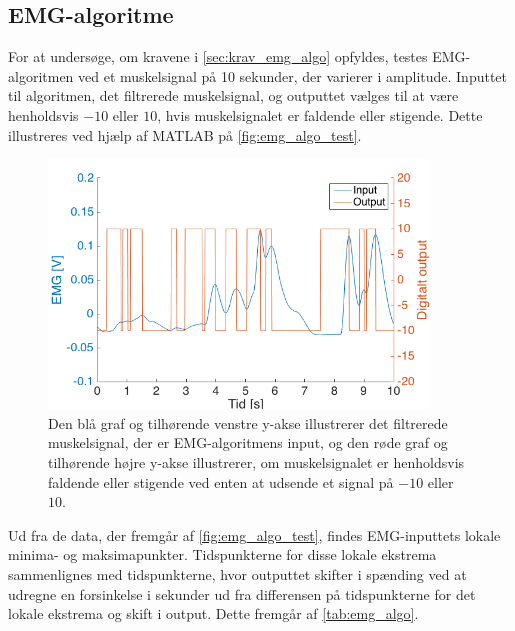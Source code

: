 \subsection{EMG-algoritme}
For at undersøge, om kravene i \autoref{sec:krav_emg_algo} opfyldes, testes EMG-algoritmen ved et muskelsignal på 10 sekunder, der varierer i amplitude. Inputtet til algoritmen, det filtrerede muskelsignal, og outputtet vælges til at være henholdsvis $-10$ eller $10$, hvis muskelsignalet er faldende eller stigende. Dette illustreres ved hjælp af MATLAB på \autoref{fig:emg_algo_test}. 

\begin{figure}[H]
\centering
\includegraphics[width=0.9\textwidth]{figures/EMG_algo_test}
\caption{Den blå graf og tilhørende venstre y-akse illustrerer det filtrerede muskelsignal, der er EMG-algoritmens input, og den røde graf og tilhørende højre y-akse illustrerer, om muskelsignalet er henholdsvis faldende eller stigende ved enten at udsende et signal på $-10$ eller $10$.}
\label{fig:emg_algo_test}
\end{figure}

\noindent
Ud fra de data, der fremgår af \autoref{fig:emg_algo_test}, findes EMG-inputtets lokale minima- og maksimapunkter. Tidspunkterne for disse lokale ekstrema sammenlignes med tidspunkterne, hvor outputtet skifter i spænding ved at udregne en forsinkelse i sekunder ud fra differensen på tidspunkterne for det lokale ekstrema og skift i output. Dette fremgår af \autoref{tab:emg_algo}. 

